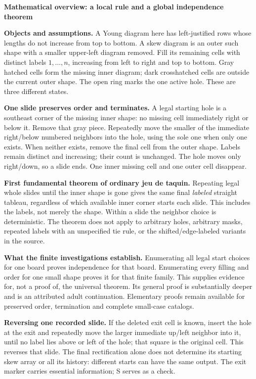 \documentclass[11pt]{article}
\newcommand{\heading}[1]{\par\textbf{#1}\par}
\begin{document}
\heading{Mathematical overview: a local rule and a global independence theorem}
\textbf{Objects and assumptions.} A Young diagram here has left-justified rows whose lengths do not increase from top to bottom. A skew diagram is an outer such shape with a smaller upper-left diagram removed. Fill its remaining cells with distinct labels $1,\ldots,n$, increasing from left to right and top to bottom. Gray hatched cells form the missing inner diagram; dark crosshatched cells are outside the current outer shape. The open ring marks the one active hole. These are three different states.

\textbf{One slide preserves order and terminates.} A legal starting hole is a southeast corner of the missing inner shape: no missing cell immediately right or below it. Remove that gray piece. Repeatedly move the smaller of the immediate right/below numbered neighbors into the hole, using the sole one when only one exists. When neither exists, remove the final cell from the outer shape. Labels remain distinct and increasing; their count is unchanged. The hole moves only right/down, so a slide ends. One inner missing cell and one outer cell disappear.

\textbf{First fundamental theorem of ordinary jeu de taquin.} Repeating legal whole slides until the inner shape is gone gives the same final \emph{labeled} straight tableau, regardless of which available inner corner starts each slide. This includes the labels, not merely the shape. Within a slide the neighbor choice is deterministic. The theorem does not apply to arbitrary holes, arbitrary masks, repeated labels with an unspecified tie rule, or the shifted/edge-labeled variants in the source.

\textbf{What the finite investigations establish.} Enumerating all legal start choices for one board proves independence for that board. Enumerating every filling and order for one small shape proves it for that finite family. This supplies evidence for, not a proof of, the universal theorem. Its general proof is substantially deeper and is an attributed adult continuation. Elementary proofs remain available for preserved order, termination and complete small-case catalogs.

\textbf{Reversing one recorded slide.} If the deleted exit cell is known, insert the hole at the exit and repeatedly move the larger immediate up/left neighbor into it, until no label lies above or left of the hole; that square is the original cell. This reverses that slide. The final rectification alone does not determine its starting skew array or all its history: different starts can have the same output. The exit marker carries essential information; S serves as a check.
\end{document}
